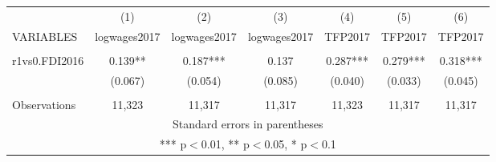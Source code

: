 \documentclass[]{article}
\begin{document}
\begin{tabular}{lcccccc} \hline
 & (1) & (2) & (3) & (4) & (5) & (6) \\
VARIABLES & logwages2017 & logwages2017 & logwages2017 & TFP2017 & TFP2017 & TFP2017 \\ \hline
 &  &  &  &  &  &  \\
r1vs0.FDI2016 & 0.139** & 0.187*** & 0.137 & 0.287*** & 0.279*** & 0.318*** \\
 & (0.067) & (0.054) & (0.085) & (0.040) & (0.033) & (0.045) \\
 &  &  &  &  &  &  \\
 Observations & 11,323 & 11,317 & 11,317 & 11,323 & 11,317 & 11,317 \\ \hline
\multicolumn{7}{c}{ Standard errors in parentheses} \\
\multicolumn{7}{c}{ *** p$<$0.01, ** p$<$0.05, * p$<$0.1} \\
\end{tabular}
\end{document}
